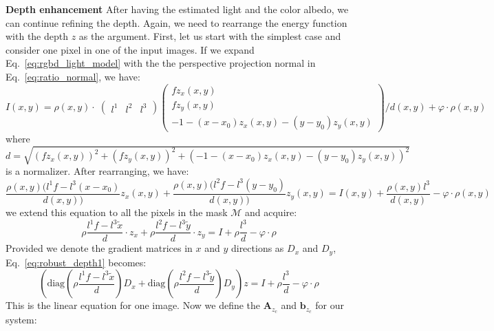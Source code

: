 \textbf{Depth enhancement}
After having the estimated light and the color albedo, we can continue refining the depth.
Again, we need to rearrange the energy function with the depth $z$ as the argument.
First, let us start with the simplest case and consider one pixel in one of the input images.
If we expand Eq.~\ref{eq:rgbd_light_model} with the the perspective projection normal in Eq.~\ref{eq:ratio_normal}, we have:
\begin{equation}
    I(x,y) = \rho(x,y) \cdot \; 
    \begin{pmatrix}
        l^1 & l^2 & l^3 
    \end{pmatrix}
     \begin{pmatrix}
         fz_x(x,y)\\
         fz_y(x,y)\\
         -1 - (x - x_0)z_x(x,y) - (y - y_0)z_y(x,y)
     \end{pmatrix}/ d(x,y)
     + \varphi \cdot \rho(x,y) 
\end{equation}
where $d = \sqrt{(fz_x(x,y))^2 + (fz_y(x,y))^2 + (-1 - (x - x_0)z_x(x,y) - (y - y_0)z_y(x,y))^2}$ is a normalizer.
After rearranging, we have:
\begin{equation}
    \frac{\rho(x,y)(l^1f - l^3(x-x_0)}{d(x,y))}z_x(x,y) + \frac{\rho(x,y)(l^2f - l^3(y-y_0)}{d(x,y))}z_y(x,y) = I(x,y) + \frac{\rho(x,y)l^3}{d(x,y)} - \varphi \cdot \rho(x,y)
\end{equation}
we extend this equation to all the pixels in the mask $\mathcal{M}$ and acquire:
\begin{equation}\label{eq:robust_depth1}
    \rho\frac{l^1f - l^3\tilde{x}}{d} \cdot z_x + \rho\frac{l^2f - l^3\tilde{y}}{d} \cdot z_y = I + \rho\frac{l^3}{d} - \varphi \cdot \rho
\end{equation}
Provided we denote the gradient matrices in $x$ and $y$ directions as $D_x$ and $D_y$, Eq.~\ref{eq:robust_depth1} becomes:
\begin{equation}\label{eq:robust_depth2}
        \left(\text{diag}(\rho\frac{l^1f - l^3\tilde{x}}{d}) D_x + \text{diag}(\rho\frac{l^2f - l^3\tilde{y}}{d}) D_y\right) z = I + \rho\frac{l^3}{d} - \varphi \cdot \rho
\end{equation}
This is the linear equation for one image. 
Now we define the $\mathbf{A}_{z_{c}}$ and $\mathbf{b}_{z_{c}}$ for our system:
